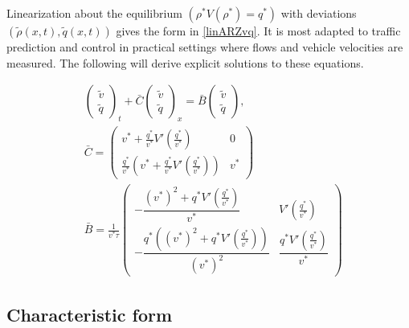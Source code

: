 \documentclass[letterpaper, 10 pt, conference]{ieeeconf}  %
\begin{document}
Linearization about the equilibrium $(\rho^*V(\rho^*) = q^*)$ with deviations $(\tilde{\rho}(x,t), \tilde{q}(x,t))$ gives the form in \eqref{linARZvq}. It is most adapted to traffic prediction and control in practical settings where flows and vehicle velocities are measured. The following will derive explicit solutions to these equations.

{\footnotesize
\begin{subequations} \label{linARZvq}
\begin{align}
&\begin{pmatrix}
	\tilde{v} \\
	\tilde{q}
\end{pmatrix}_t
+ \bar{C}
\begin{pmatrix}
	\tilde{v} \\ 
	\tilde{q}
\end{pmatrix}_x 
= 
\bar{B}
\begin{pmatrix}
	\tilde{v} \\
	\tilde{q}
\end{pmatrix}, \\
&\bar{C} 
=
\begin{pmatrix}
	v^* + \frac{q^*}{v^*} V'\left(\frac{q^*}{v^*}\right) & 0 \\
	\frac{q^*}{v^*} \left( v^* + \frac{q^*}{v^*} V'\left(\frac{q^*}{v^*}\right)\right) & v^*
\end{pmatrix} \\
&\bar{B} 
=
\frac{1}{v^{*}\tau}
\begin{pmatrix}
		-\dfrac{(v^*)^2+q^*V'\left(\frac{q^*}{v^*}\right)}{v^*} & V'\left(\frac{q^*}{v^*}\right) \\
		-\dfrac{q^*\left((v^*)^2 + q^*V'\left(\frac{q^*}{v^*}\right)\right)}{(v^*)^2}  & \dfrac{q^*V'\left(\frac{q^*}{v^*}\right)}{v^*}
\end{pmatrix}
\end{align}
\end{subequations}
}


\subsection{Characteristic form}
\end{document}
